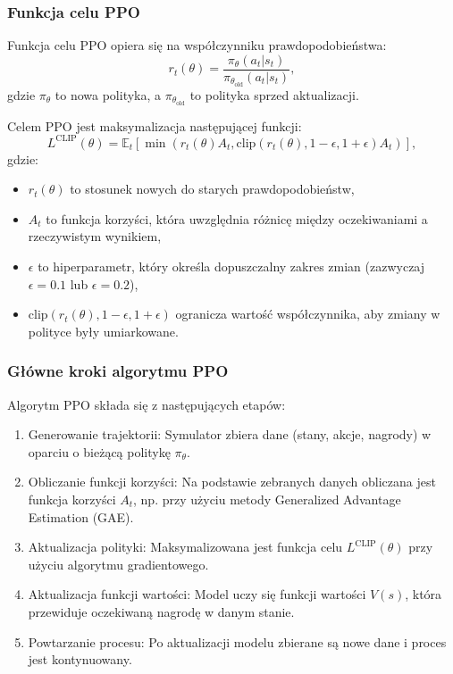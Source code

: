 \documentclass[conference]{IEEEtran}
\begin{document}
\subsubsection{Funkcja celu PPO}
Funkcja celu PPO opiera się na współczynniku prawdopodobieństwa:
\[
r_t(\theta) = \frac{\pi_\theta(a_t|s_t)}{\pi_{\theta_{\text{old}}}(a_t|s_t)},
\]
gdzie $\pi_\theta$ to nowa polityka, a $\pi_{\theta_{\text{old}}}$ to polityka sprzed aktualizacji.

Celem PPO jest maksymalizacja następującej funkcji:
\[
L^{\text{CLIP}}(\theta) = \mathbb{E}_t \left[ \min\left( r_t(\theta)A_t, \text{clip}(r_t(\theta), 1 - \epsilon, 1 + \epsilon)A_t \right) \right],
\]
gdzie:
\begin{itemize}
    \item $r_t(\theta)$ to stosunek nowych do starych prawdopodobieństw,
    \item $A_t$ to funkcja korzyści, która uwzględnia różnicę między oczekiwaniami a rzeczywistym wynikiem,
    \item $\epsilon$ to hiperparametr, który określa dopuszczalny zakres zmian (zazwyczaj $\epsilon = 0.1$ lub $\epsilon = 0.2$),
    \item $\text{clip}(r_t(\theta), 1 - \epsilon, 1 + \epsilon)$ ogranicza wartość współczynnika, aby zmiany w polityce były umiarkowane.
\end{itemize}

\subsubsection{Główne kroki algorytmu PPO}
Algorytm PPO składa się z następujących etapów:
\begin{enumerate}
    \item Generowanie trajektorii: Symulator zbiera dane (stany, akcje, nagrody) w oparciu o bieżącą politykę $\pi_\theta$.
    \item Obliczanie funkcji korzyści: Na podstawie zebranych danych obliczana jest funkcja korzyści $A_t$, np. przy użyciu metody Generalized Advantage Estimation (GAE).
    \item Aktualizacja polityki: Maksymalizowana jest funkcja celu $L^{\text{CLIP}}(\theta)$ przy użyciu algorytmu gradientowego.
    \item Aktualizacja funkcji wartości: Model uczy się funkcji wartości $V(s)$, która przewiduje oczekiwaną nagrodę w danym stanie.
    \item Powtarzanie procesu: Po aktualizacji modelu zbierane są nowe dane i proces jest kontynuowany.
\end{enumerate}
\end{document}
